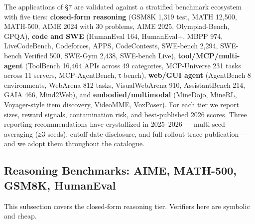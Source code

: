 \documentclass{article}
\begin{document}
The applications of §7 are validated against a stratified benchmark ecosystem with five tiers: \textbf{closed-form reasoning} (GSM8K 1,319 test, MATH 12,500, MATH-500, AIME 2024 with 30 problems, AIME 2025, Olympiad-Bench, GPQA), \textbf{code and SWE} (HumanEval 164, HumanEval+, MBPP 974, LiveCodeBench, Codeforces, APPS, CodeContests, SWE-bench 2,294, SWE-bench Verified 500, SWE-Gym 2,438, SWE-bench Live), \textbf{tool/MCP/multi-agent} (ToolBench 16,464 APIs across 49 categories, MCP-Universe 231 tasks across 11 servers, MCP-AgentBench, τ-bench), \textbf{web/GUI agent} (AgentBench 8 environments, WebArena 812 tasks, VisualWebArena 910, AssistantBench 214, GAIA 466, Mind2Web), and \textbf{embodied/multimodal} (MineDojo, MineRL, Voyager-style item discovery, VideoMME, VoxPoser). For each tier we report sizes, reward signals, contamination risk, and best-published 2026 scores. Three reporting recommendations have crystallized in 2025--2026 --- multi-seed averaging (≥3 seeds), cutoff-date disclosure, and full rollout-trace publication --- and we adopt them throughout the catalogue.

\subsection{Reasoning Benchmarks: AIME, MATH-500, GSM8K, HumanEval}\label{reasoning-benchmarks-aime-math-500-gsm8k-humaneval}

This subsection covers the closed-form reasoning tier. Verifiers here are symbolic and cheap.
\end{document}
